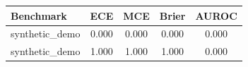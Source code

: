 \begin{tabular}{lcccc}
\toprule
Benchmark & ECE & MCE & Brier & AUROC \\
\midrule
synthetic_demo & 0.000 & 0.000 & 0.000 & 0.000 \\
synthetic_demo & 1.000 & 1.000 & 1.000 & 0.000 \\
\bottomrule
\end{tabular}
